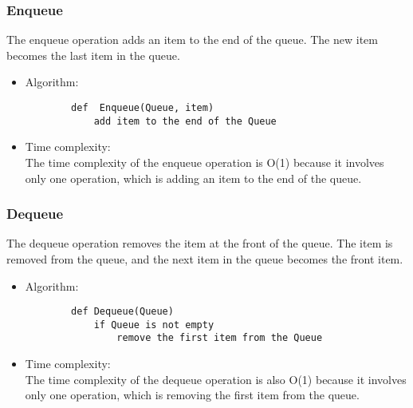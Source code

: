 \documentclass[a4paper, 11pt, oneside]{book} %
\begin{document}
\subsubsection{Enqueue}
The enqueue operation adds an item to the end of the queue. The new item becomes the last item in the queue.

\begin{itemize}
    \item Algorithm:
    \\
    \begin{lstlisting}
        def  Enqueue(Queue, item)
            add item to the end of the Queue
    \end{lstlisting}    
    \item Time complexity:
    \\
    The time complexity of the enqueue operation is O(1) because it involves only one operation, which is adding an item to the end of the queue.
\end{itemize}

\subsubsection{Dequeue}
The dequeue operation removes the item at the front of the queue. The item is removed from the queue, and the next item in the queue becomes the front item.

\begin{itemize}
    \item Algorithm:
    \\
    \begin{lstlisting}
        def Dequeue(Queue)
            if Queue is not empty
                remove the first item from the Queue
    \end{lstlisting}    
    \item Time complexity:
    \\
    The time complexity of the dequeue operation is also O(1) because it involves only one operation, which is removing the first item from the queue.
\end{itemize}
\end{document}
